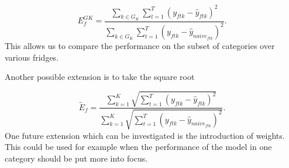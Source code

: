 \begin{equation}
E^{GK}_{f}=\frac{\sum_{k \in G_K}\sum_{t=1}^T(y_{ftk}-\hat{y}_{ftk})^2}{\sum_{k \in G_K}\sum_{t=1}^T(y_{ftk}-\hat{y}_{naive_{ftk}})^2}.
\label{eq: Error Measure Subsets}
\end{equation}
%
This allows us to compare the performance on the subset of categories over various fridges. 

Another possible extension is to take the square root

\begin{equation}
\widetilde{E}_f=\frac{\sum_{k=1}^{K}\sqrt{\sum_{t=1}^T(y_{ftk}-\hat{y}_{ftk})^2}}{\sum_{k=1}^{K}\sqrt{\sum_{t=1}^T(y_{ftk}-\hat{y}_{naive_{ftk}})^2}}.
\label{eq: Error Measure Sqrt} 
\end{equation}
%
One future extension which can be investigated is the introduction of weights. This could be used for example when the performance of the model in one category should be put more into focus. 